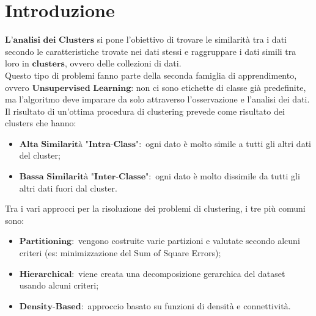 \section{Introduzione}
    $\textbf{L'analisi dei Clusters}$ si pone l'obiettivo di trovare le similarità tra i dati secondo le caratteristiche trovate nei dati stessi e raggruppare i dati simili tra loro in $\textbf{clusters}$, ovvero delle collezioni di dati.
    \\[1\baselineskip]
    Questo tipo di problemi fanno parte della seconda famiglia di apprendimento, ovvero $\textbf{Unsupervised Learning}$: non ci sono etichette di classe già predefinite, ma l'algoritmo deve imparare da solo attraverso l'osservazione e l'analisi dei dati.
    \\[1\baselineskip]
    Il risultato di un'ottima procedura di clustering prevede come risultato dei clusters che hanno:
        \begin{itemize}
            \item $\textbf{Alta Similarità "Intra-Class"}:$ ogni dato è molto simile a tutti gli altri dati del cluster;
            \item $\textbf{Bassa Similarità "Inter-Classe"}:$ ogni dato è molto dissimile da tutti gli altri dati fuori dal cluster.
                \\[1\baselineskip]
        \end{itemize}

    Tra i vari approcci per la risoluzione dei problemi di clustering, i tre più comuni sono:
        \begin{itemize}
            \item $\textbf{Partitioning}:$ vengono costruite varie partizioni e valutate secondo alcuni criteri (es: minimizzazione del Sum of Square Errors);
            \item $\textbf{Hierarchical}:$ viene creata una decomposizione gerarchica del dataset usando alcuni criteri;
            \item $\textbf{Density-Based}:$ approccio basato su funzioni di densità e connettività.
        \end{itemize}

\clearpage